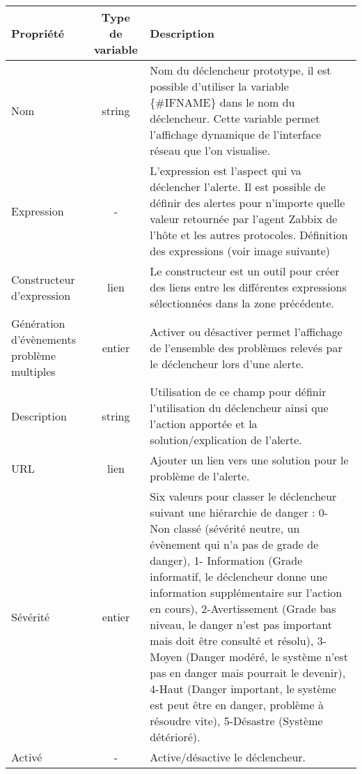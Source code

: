	\begin{tabular}{|m{3cm}|c|m{10cm}|}
		\hline
		\bf Propriété & \bf Type de variable & \bf Description \\

		\hline
		Nom & string & Nom du déclencheur prototype, il est possible d'utiliser la variable \{\#IFNAME\} dans le nom du déclencheur. Cette variable permet l'affichage dynamique de l'interface réseau que l'on visualise.\\

		\hline
		Expression & - & L'expression est l'aspect qui va déclencher l'alerte. Il est possible de définir des alertes pour n'importe quelle valeur retournée par l'agent Zabbix de l'hôte et les autres protocoles. Définition des expressions (voir image suivante)\\

		\hline
		Constructeur d'expression & lien & Le constructeur est un outil pour créer des liens entre les différentes expressions sélectionnées dans la zone précédente. \\

		\hline
		Génération d'évènements problème multiples & entier & Activer ou désactiver permet l'affichage de l'ensemble des problèmes relevés par le déclencheur lors d'une alerte.\\

		\hline
		Description & string & Utilisation de ce champ pour définir l'utilisation du déclencheur ainsi que l'action apportée et la solution/explication de l'alerte.\\

		\hline
		URL & lien & Ajouter un lien vers une solution pour le problème de l'alerte.\\

		\hline
		Sévérité & entier & Six valeurs pour classer le déclencheur suivant une hiérarchie de danger : 0- Non classé (sévérité neutre, un évènement qui n'a pas de grade de danger), 1- Information (Grade informatif, le déclencheur donne une information supplémentaire sur l'action en cours), 2-Avertissement (Grade bas niveau, le danger n'est pas important mais doit être consulté et résolu), 3-Moyen (Danger modéré, le système n'est pas en danger mais pourrait le devenir), 4-Haut (Danger important, le système est peut être en danger, problème à résoudre vite), 5-Désastre (Système détérioré).\\

		\hline
		Activé & - & Active/désactive le déclencheur.\\

		\hline
	\end{tabular}


